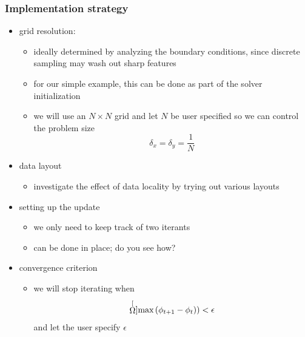 \begin{frame}[fragile]
%
  \frametitle{Implementation strategy}
%
  \begin{itemize}
%
  \item grid resolution:
    \begin{itemize}
     \item ideally determined by analyzing the boundary conditions, since discrete sampling may
       wash out sharp features
     \item for our simple example, this can be done as part of the solver initialization
     \item we will use an $N \times N$ grid and let $N$ be user specified so we can control the
       problem size
       \begin{equation}
         \delta_{x} = \delta_{y} = \frac{1}{N}
       \end{equation}
     \end{itemize}
%
  \item data layout
    \begin{itemize}
    \item investigate the effect of data locality by trying out various layouts
    \end{itemize}
%
  \item setting up the update
    \begin{itemize}
      \item we only need to keep track of two iterants
      \item can be done in place; do you see how?
    \end{itemize}
%
  \item convergence criterion
    \begin{itemize}
    \item we will stop iterating when
      \begin{equation}
        \stackrel[\Omega]{}{\mbox{\rm max}}\, (\phi_{t+1} - \phi_{t})) < \epsilon
      \end{equation}
      and let the user specify $\epsilon$
    \end{itemize}
%
  \end{itemize}
% 
\end{frame}

%

